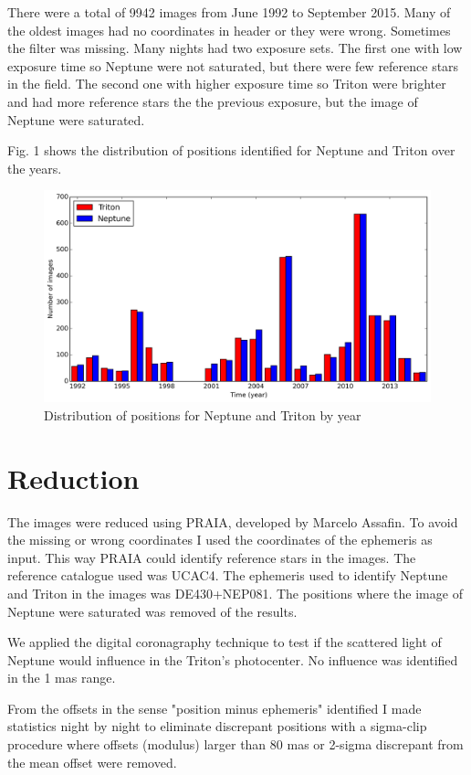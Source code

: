 \documentclass[12pt,a4paper]{report}
\begin{document}
There were a total of 9942 images from June 1992 to September 2015. Many of the oldest images had no coordinates in header or they were wrong. Sometimes the filter was missing. Many nights had two exposure sets. The first one with low exposure time so Neptune were not saturated, but there were few reference stars in the field. The second one with higher exposure time so Triton were brighter and had more reference stars the the previous exposure, but the image of Neptune were saturated.

Fig. 1 shows the distribution of positions identified for Neptune and Triton over the years.

\begin{figure}[h]
\includegraphics[width=16.0cm]{pos-distribution.png} 
\caption{Distribution of positions for Neptune and Triton by year}
\label{Fig:pos-dist}
\end{figure}


\section*{Reduction}

The images were reduced using PRAIA, developed by Marcelo Assafin. To avoid the missing or wrong coordinates I used the coordinates of the ephemeris as input. This way PRAIA could identify reference stars in the images. The reference catalogue used was UCAC4. The ephemeris used to identify Neptune and Triton in the images was DE430+NEP081. The positions where the image of Neptune were saturated was removed of the results.

We applied the digital coronagraphy technique to test if the scattered light of Neptune would influence in the Triton's photocenter. No influence was identified in the 1 mas range.

From the offsets in the sense "position minus ephemeris" identified I made statistics night by night to eliminate discrepant positions with a sigma-clip procedure where offsets (modulus) larger than 80 mas or 2-sigma discrepant from the mean offset were removed.
\end{document}
